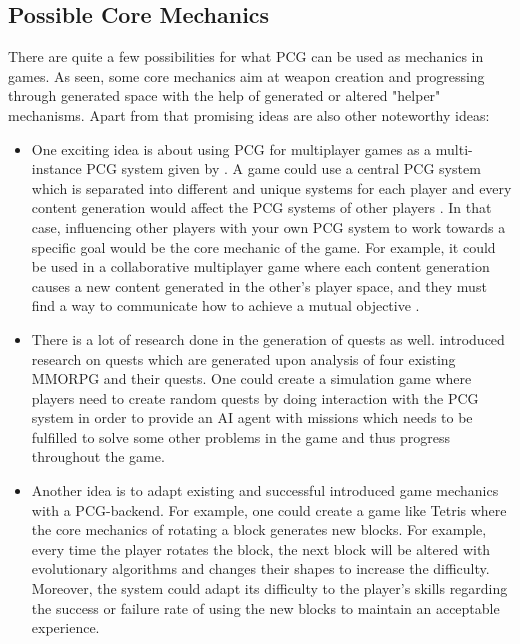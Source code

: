 \documentclass[MGS,Master,english]{twbook}%
\begin{document}
\subsection{Possible Core Mechanics}
There are quite a few possibilities for what PCG can be used as mechanics in games. As seen, some core mechanics aim at weapon creation and progressing through generated space with the help of generated or altered "helper" mechanisms. Apart from that promising ideas are also other noteworthy ideas:
\begin{itemize}
	\item One exciting idea is about using PCG for multiplayer games as a multi-instance PCG system given by \cite{pcg::futureOfPcgInGames}. A game could use a central PCG system which is separated into different and unique systems for each player and every content generation would affect the PCG systems of other players \cite{pcg::futureOfPcgInGames}. In that case, influencing other players with your own PCG system to work towards a specific goal would be the core mechanic of the game. For example, it could be used in a collaborative multiplayer game where each content generation causes a new content generated in the other's player space, and they must find a way to communicate how to achieve a mutual objective \cite{pcg::futureOfPcgInGames}. 
	\item There is a lot of research done in the generation of quests as well. \cite{pcg::questGenerator} introduced research on quests which are generated upon analysis of four existing \ac{MMORPG} and their quests. One could create a simulation game where players need to create random quests by doing interaction with the PCG system in order to provide an AI agent with missions which needs to be fulfilled to solve some other problems in the game and thus progress throughout the game.
	\item Another idea is to adapt existing and successful introduced game mechanics with a PCG-backend. For example, one could create a game like Tetris where the core mechanics of rotating a block generates new blocks. For example, every time the player rotates the block, the next block will be altered with evolutionary algorithms and changes their shapes to increase the difficulty. Moreover, the system could adapt its difficulty to the player's skills regarding the success or failure rate of using the new blocks to maintain an acceptable experience.
\end{itemize} 

%
%
\clearpage
\end{document}
